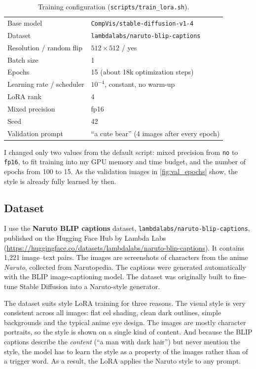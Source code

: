 \documentclass[a4paper]{article} %
\begin{document}
\begin{table}[H]
\centering
\caption{Training configuration (\texttt{scripts/train\_lora.sh}).}
\label{tab:lora_cfg}
\begin{tabular}{ll}
\toprule
Base model & \texttt{CompVis/stable-diffusion-v1-4} \\
Dataset & \texttt{lambdalabs/naruto-blip-captions} \\
Resolution / random flip & $512\times512$ / yes \\
Batch size & 1 \\
Epochs & 15 (about 18k optimization steps) \\
Learning rate / scheduler & $10^{-4}$, constant, no warm-up \\
LoRA rank & 4 \\
Mixed precision & fp16 \\
Seed & 42 \\
Validation prompt & ``a cute bear'' (4 images after every epoch) \\
\bottomrule
\end{tabular}
\end{table}

I changed only two values from the default script: mixed precision from \texttt{no} to
\texttt{fp16}, to fit training into my GPU memory and time budget, and the number of epochs from
100 to 15. As the validation images in \autoref{fig:val_epochs} show, the style is already fully
learned by then.

\subsection{Dataset}

I use the \textbf{Naruto BLIP captions} dataset, \texttt{lambdalabs/naruto-blip-captions}, published
on the Hugging Face Hub by Lambda Labs (\url{https://huggingface.co/datasets/lambdalabs/naruto-blip-captions}).
It contains 1,221 image--text pairs. The images are screenshots of characters from the anime
\emph{Naruto}, collected from Narutopedia. The captions were generated automatically with the BLIP
image-captioning model. The dataset was originally built to fine-tune Stable Diffusion into a
Naruto-style generator.

The dataset suits style LoRA training for three reasons. The visual style is very consistent across
all images: flat cel shading, clean dark outlines, simple backgrounds and the typical anime eye
design. The images are mostly character portraits, so the style is shown on a single kind of
content. And because the BLIP captions describe the \emph{content} (``a man with dark hair'') but
never mention the style, the model has to learn the style as a property of the images rather than
of a trigger word. As a result, the LoRA applies the Naruto style to any prompt.
\end{document}
